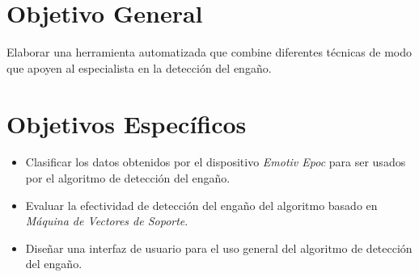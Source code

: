 \section{Objetivo General}
Elaborar una herramienta automatizada que combine diferentes técnicas de modo que apoyen al especialista en la detección del engaño.

\section{Objetivos Específicos}
\begin{itemize}
\item Clasificar los datos obtenidos por el dispositivo \textit{Emotiv Epoc} para ser usados por el algoritmo de detección del engaño. 
\item Evaluar la efectividad de detección del engaño del algoritmo basado en \textit{Máquina de Vectores de Soporte}.
\item Diseñar una interfaz de usuario para el uso general del algoritmo de detección del engaño. 
\end{itemize}